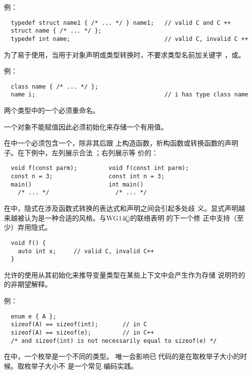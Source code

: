 例：
\begin{lstlisting}
  typedef struct name1 { /* ... */ } name1;   // valid C and C ++
  struct name { /* ... */ };
  typedef int name;                           // valid C, invalid C ++
\end{lstlisting}
\diffrat 为了易于使用，当用于对象声明或类型转换时，\cpp{}不要求类型名前加关键字
，或。

例：
\begin{lstlisting}
  class name { /* ... */ };
  name i;                                     // i has type class name
\end{lstlisting}
\diffeff \semdel
\diffdiff \semtrans 两个类型中的一个必须重命名。
\diffuse \seldom

\diffrat 一个对象不能赋值因此必须初始化来存储一个有用值。
\diffeff \semdel
\diffdiff \semtrans
\diffuse \seldom

在\cpp{}中一个必须包含一个，除非其后跟
上构造函数，析构函数或转换函数的声明子。在下例中，左列展示合法的\c{}；右列展示等
价的\cpp{}：
\begin{lstlisting}
  void f(const parm);         void f(const int parm);
  const n = 3;                const int n = 3;
  main()                      int main()
    /* ... */                   /* ... */
\end{lstlisting}
\diffrat 在\cpp{}中，隐式在涉及函数式转换的表达式和声明之间会引起多处歧
义。显式声明越来越被认为是一种合适的风格。与WG14(\c{})的联络表明在\c{}的下一个修
正中支持（至少）弃用隐式。
\diffeff \semdel
\diffdiff \syntrans \aut
\diffuse \common

\begin{lstlisting}
  void f() {
    auto int x;     // valid C, invalid C++
  }
\end{lstlisting}
\diffrat 允许的使用从其初始化来推导变量类型在某些上下文中会产生作为存储
说明符的的非期望解释。
\diffeff \semdel
\diffdiff \syntrans
\diffuse \rare

例：
\begin{lstlisting}
  enum e { A };
  sizeof(A) == sizeof(int);       // in C
  sizeof(A) == sizeof(e);         // in C++
  /* and sizeof(int) is not necessarily equal to sizeof(e) */
\end{lstlisting}
\diffrat 在\cpp{}中，一个枚举是一个不同的类型。
\diffeff \semchg
\diffdiff \semtrans
\diffuse \seldom 唯一会影响已有\c{}代码的是在取枚举子大小的时候。取枚举子大小不
是一个常见的\c{}编码实践。

